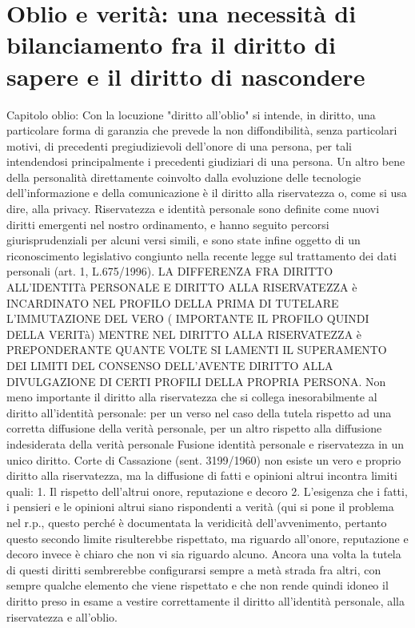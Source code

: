 \section{Oblio e verità: una necessità di bilanciamento fra il diritto di sapere e il diritto di nascondere}%
Capitolo oblio:
Con la locuzione "diritto all'oblio" si intende, in diritto, una particolare forma di garanzia che prevede la non diffondibilità, senza particolari motivi, di precedenti pregiudizievoli dell'onore di una persona, per tali intendendosi principalmente i precedenti giudiziari di una persona.
Un altro bene della personalità direttamente coinvolto dalla evoluzione delle tecnologie dell’informazione e della comunicazione è il diritto alla riservatezza o, come si usa dire, alla privacy.
Riservatezza e identità personale sono definite come nuovi diritti emergenti nel nostro ordinamento, e hanno seguito percorsi giurisprudenziali per alcuni versi simili, e sono state infine oggetto di un riconoscimento legislativo congiunto nella recente legge sul trattamento dei dati personali (art. 1, L.675/1996).
LA DIFFERENZA FRA DIRITTO ALL’IDENTITà PERSONALE E DIRITTO ALLA RISERVATEZZA è INCARDINATO NEL PROFILO DELLA PRIMA DI TUTELARE L’IMMUTAZIONE DEL VERO ( IMPORTANTE IL PROFILO QUINDI DELLA VERITà) MENTRE NEL DIRITTO ALLA RISERVATEZZA è PREPONDERANTE QUANTE VOLTE SI LAMENTI IL SUPERAMENTO DEI LIMITI DEL CONSENSO DELL’AVENTE DIRITTO ALLA DIVULGAZIONE DI CERTI PROFILI DELLA PROPRIA PERSONA.
Non meno importante il diritto alla riservatezza che si collega inesorabilmente al diritto all’identità personale: per un verso nel caso della tutela rispetto ad una corretta diffusione della verità personale, per un altro rispetto alla diffusione indesiderata della verità personale
Fusione identità personale e riservatezza in un unico diritto.
Corte di Cassazione (sent. 3199/1960) non esiste un vero e proprio diritto alla riservatezza, ma la diffusione di fatti e opinioni altrui incontra limiti quali:
1.	Il rispetto dell’altrui onore, reputazione e decoro
2.	L’esigenza che i fatti, i pensieri e le opinioni altrui siano rispondenti a verità (qui si pone il problema nel r.p., questo perché è documentata la veridicità dell’avvenimento, pertanto questo secondo limite risulterebbe rispettato, ma riguardo all’onore, reputazione e decoro invece è chiaro che non vi sia riguardo alcuno. Ancora una volta la tutela di questi diritti sembrerebbe configurarsi sempre a metà strada fra altri, con sempre qualche elemento che viene rispettato e che non rende quindi idoneo il diritto preso in esame a vestire correttamente il diritto all’identità personale, alla riservatezza e all’oblio.
